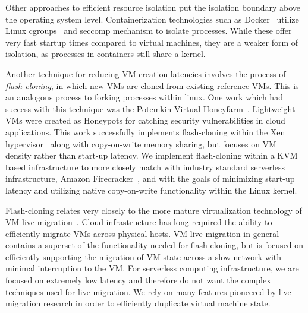 Other approaches to efficient resource isolation put the isolation boundary
above the operating system level. Containerization technologies such as
Docker~\cite{docker} utilize Linux cgroups~\cite{cgroups} and seccomp mechanism
to isolate processes. While these offer very fast startup times compared to
virtual machines, they are a weaker form of isolation, as processes in
containers still share a kernel.

Another technique for reducing VM creation latencies involves the process of
\emph{flash-cloning}, in which new VMs are cloned from existing reference VMs.
This is an analogous process to forking processes within linux. One work which
had success with this technique was the Potemkin Virtual
Honeyfarm~\cite{potemkin}. Lightweight VMs were created as Honeypots for
catching security vulnerabilities in cloud applications. This work successfully
implements flash-cloning within the Xen hypervisor~\cite{xen} along with
copy-on-write memory sharing, but focuses on VM density rather than start-up
latency. We implement flash-cloning within a KVM based infrastructure to more
closely match with industry standard serverless infrastructure, Amazon
Firecracker~\cite{firecracker}, and with the goals of minimizing start-up
latency and utilizing native copy-on-write functionality within the Linux
kernel.

 Flash-cloning relates very closely to the more
mature virtualization technology of VM live
migration~\cite{post-copy-migration}\cite{snowflock}. Cloud infrastructure has
long required the ability to efficiently migrate VMs across physical hosts. VM
live migration in general contains a superset of the functionality needed for
flash-cloning, but is focused on efficiently supporting the migration of VM
state across a slow network with minimal interruption to the VM. For serverless
computing infrastructure, we are focused on extremely low latency and therefore
do not want the complex techniques used for live-migration. We rely on many
features pioneered by live migration research in order to efficiently duplicate
virtual machine state.
